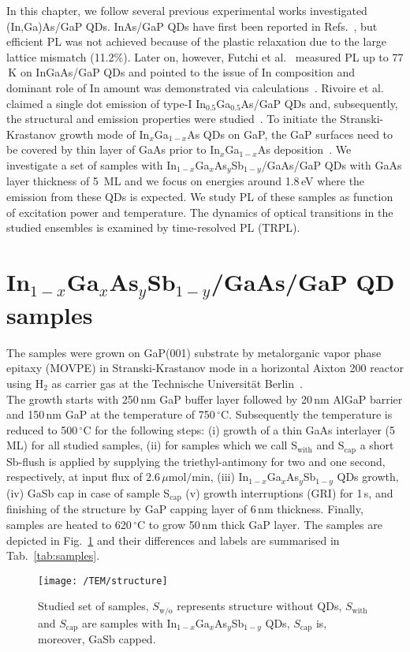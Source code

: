 In this chapter, we follow several previous experimental works investigated {(In,Ga)As}/{GaP} QDs. InAs/GaP QDs have first been reported in Refs.~\citep{Leon_apl1998, guo_solidi2009}, but efficient PL was not achieved because of the plastic relaxation due to the large lattice mismatch (11.2\%). Later on, however, Futchi et al.~\citep{Fuchi_physicaE2004} measured PL up to 77$\,$K on InGaAs/GaP QDs and pointed to the issue of In composition and dominant role of In amount was demonstrated via calculations~\citep{Fukami_solodi2011}. Rivoire et al.~\citep{Rivoire_prb2012} claimed a single dot emission of type-I In$_{0.5}$Ga$_{0.5}$As/GaP QDs and, subsequently, the structural and emission properties were studied~\cite{Stracke_apl2014, Sala_apl2016}. To initiate the Stranski-Krastanov growth mode of In$_x$Ga$_{1-x}$As QDs on GaP, the GaP surfaces need to be covered by thin layer of GaAs prior to In$_x$Ga$_{1-x}$As deposition~\citep{stracke_apl2012_qdflash_GaP}.
%
%
%
%
We investigate a set of samples with In$_{1-x}$Ga$_{x}$As$_y$Sb$_{1-y}$/GaAs/GaP QDs with GaAs layer thickness of 5~ML and we focus on energies around 1.8$\,$eV where the emission from these QDs is expected. We study PL of these samples as function of excitation power and temperature. The dynamics of optical transitions in the studied ensembles is examined by time-resolved PL (TRPL).


\section{In$_{1-x}$Ga$_{x}$As$_y$Sb$_{1-y}$/GaAs/GaP QD samples}
The samples were grown on GaP(001) substrate by metalorganic vapor phase epitaxy (MOVPE) in Stranski-Krastanov mode in a horizontal Aixton 200 reactor using H$_2$ as carrier gas at the Technische Universität Berlin~\citep{Sala_apl2016}. \\
%
\indent The growth starts with 250$\,$nm GaP buffer layer followed by 20$\,$nm AlGaP barrier and 150$\,$nm GaP at the temperature of 750$\,$$^\circ$C. Subsequently the temperature is reduced to 500$\,$$^\circ$C for the following steps: (i) growth of a thin GaAs interlayer (5$\,$ML) for all studied samples, (ii) for samples which we call S$_\mathrm{with}$ and S$_\mathrm{cap}$ a short Sb-flush is applied by supplying the triethyl-antimony for two and one second, respectively, at input flux of $2.6\,\mu\mathrm{mol/min}$, (iii) In$_{1-x}$Ga$_{x}$As$_y$Sb$_{1-y}$ QDs growth, (iv) GaSb cap in case of sample S$_\mathrm{cap}$ (v) growth interruptions (GRI) for 1$\,$s, and finishing of the structure by GaP capping layer of 6$\,$nm thickness. Finally, samples are heated to 620$\,$$^\circ$C to grow 50$\,$nm thick GaP layer. The samples are depicted in Fig.~\ref{fig:TUstructure} and their differences and labels are summarised in Tab.~\ref{tab:samples}.
\begin{figure}
	\centering
	\texttt{[image: /TEM/structure]}
	\caption{Studied set of samples, $S_\mathrm{w/o}$ represents structure without QDs, $S_\mathrm{with}$ and $S_\mathrm{cap}$ are samples with In$_{1-x}$Ga$_{x}$As$_y$Sb$_{1-y}$ QDs, $S_\mathrm{cap}$ is, moreover, GaSb capped. }
	\label{fig:TUstructure}
\end{figure}


